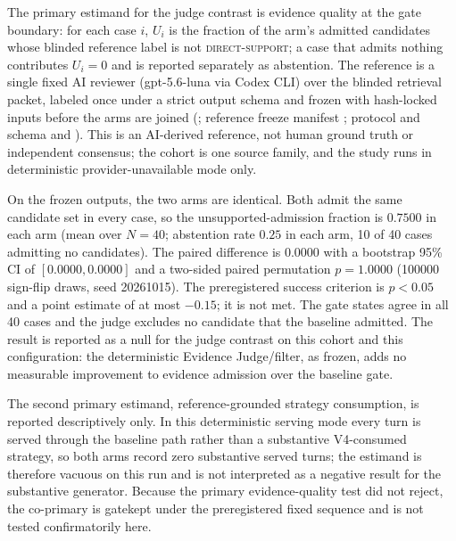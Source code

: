 The primary estimand for the judge contrast is evidence quality at the
gate boundary: for each case $i$, $U_i$ is the fraction of the arm's
admitted candidates whose blinded reference label is not
\textsc{direct-support}; a case that admits nothing contributes
$U_i=0$ and is reported separately as abstention. The reference is a
single fixed AI reviewer (gpt-5.6-luna via Codex CLI) over the blinded
retrieval packet, labeled once under a strict output schema and frozen
with hash-locked inputs before the arms are joined
(;
reference freeze manifest
;
protocol and schema
and ).
This is an AI-derived reference, not human ground truth or independent
consensus; the cohort is one source family, and the study runs in
deterministic provider-unavailable mode only.

On the frozen outputs, the two arms are identical. Both admit the same
candidate set in every case, so the unsupported-admission fraction is
$0.7500$ in each arm (mean over $N=40$; abstention rate $0.25$ in each
arm, 10 of 40 cases admitting no candidates). The paired difference is
$0.0000$ with a bootstrap 95\% CI of $[0.0000, 0.0000]$ and a two-sided
paired permutation $p = 1.0000$ (100000 sign-flip draws, seed
20261015). The preregistered success criterion is $p<0.05$ and a point
estimate of at most $-0.15$; it is not met. The gate states agree in all
40 cases and the judge excludes no candidate that the baseline admitted.
The result is reported as a null for the judge contrast on this cohort and
this configuration: the deterministic Evidence Judge/filter, as frozen,
adds no measurable improvement to evidence admission over the baseline
gate.

The second primary estimand, reference-grounded strategy consumption,
is reported descriptively only. In this deterministic serving mode every
turn is served through the baseline path rather than a substantive
V4-consumed strategy, so both arms record zero substantive served turns;
the estimand is therefore vacuous on this run and is not interpreted as a
negative result for the substantive generator. Because the primary
evidence-quality test did not reject, the co-primary is gatekept under the
preregistered fixed sequence and is not tested confirmatorily here.

